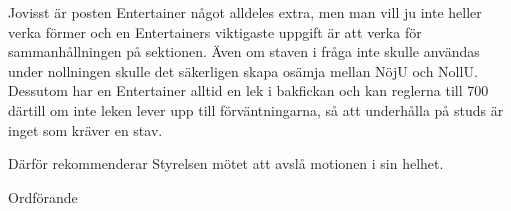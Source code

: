 \documentclass[../_main/handlingar.tex]{subfiles}
\begin{document}
\motionssvar

Jovisst är posten Entertainer något alldeles extra, men man vill ju inte heller verka förmer och en Entertainers viktigaste uppgift är att verka för sammanhållningen på sektionen. Även om staven i fråga inte skulle användas under nollningen skulle det säkerligen skapa osämja mellan NöjU och NollU. Dessutom har en Entertainer alltid en lek i bakfickan och kan reglerna till 700 därtill om inte leken lever upp till förväntningarna, så att underhålla på studs är inget som kräver en stav. 

Därför rekommenderar Styrelsen mötet att avslå motionen i sin helhet. 


\begin{signatures}{1}
    \ist
    \signature{\ordf}{Ordförande}
\end{signatures}
\end{document}
